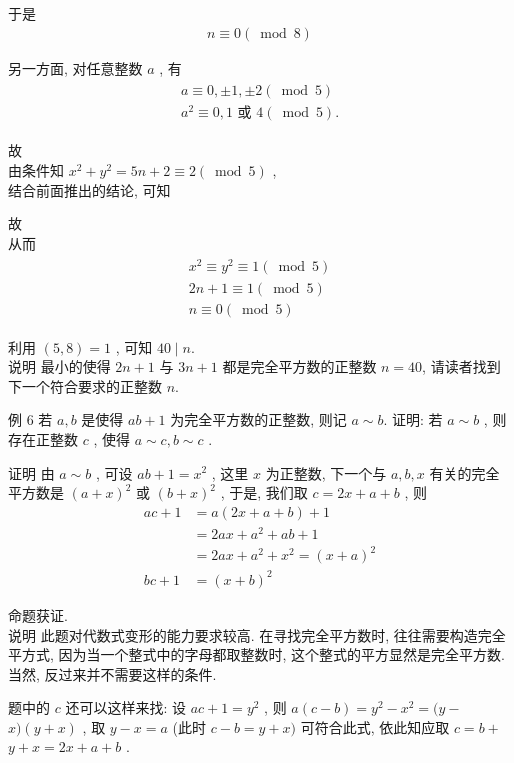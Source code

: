 于是
\begin{align*}
	n \equiv 0(\bmod 8)
\end{align*}

另一方面, 对任意整数 $a$ , 有
\begin{align*}
	\begin{gathered}
		a \equiv 0, \pm 1, \pm 2(\bmod 5) \\
		a^{2} \equiv 0,1 \text { 或 } 4(\bmod 5) .
	\end{gathered}
\end{align*}

故\\
由条件知 $x^{2}+y^{2}=5 n+2 \equiv 2(\bmod 5)$ , \\
结合前面推出的结论, 可知

故\\
从而
\begin{align*}
	\begin{gathered}
		x^{2} \equiv y^{2} \equiv 1(\bmod 5) \\
		2 n+1 \equiv 1(\bmod 5) \\
		n \equiv 0(\bmod 5)
	\end{gathered}
\end{align*}

利用 $(5,8)=1$ , 可知 $40 \mid n$.\\
说明 最小的使得 $2 n+1$ 与 $3 n+1$ 都是完全平方数的正整数 $n=40$, 请读者找到下一个符合要求的正整数 $n$.

例 6 若 $a ,  b$ 是使得 $a b+1$ 为完全平方数的正整数, 则记 $a \sim b$. 证明: 若 $a \sim b$ , 则存在正整数 $c$ , 使得 $a \sim c, b \sim c$ .

证明 由 $a \sim b$ , 可设 $a b+1=x^{2}$ , 这里 $x$ 为正整数, 下一个与 $a ,  b ,  x$ 有关的完全平方数是 $(a+x)^{2}$ 或 $(b+x)^{2}$ , 于是, 我们取 $c=2 x+a+b$ , 则\begin{align}
	a c+1 & =a(2 x+a+b)+1                \\
	      & =2 a x+a^{2}+a b+1           \\
	      & =2 a x+a^{2}+x^{2}=(x+a)^{2} \\
	b c+1 & =(x+b)^{2}
\end{align}

命题获证.\\
说明 此题对代数式变形的能力要求较高. 在寻找完全平方数时, 往往需要构造完全平方式, 因为当一个整式中的字母都取整数时, 这个整式的平方显然是完全平方数. 当然, 反过来并不需要这样的条件.

题中的 $c$ 还可以这样来找: 设 $a c+1=y^{2}$ , 则 $a(c-b)=y^{2}-x^{2}=(y-$ $x)(y+x)$ , 取 $y-x=a$ (此时 $c-b=y+x)$ 可符合此式, 依此知应取 $c=b+$ $y+x=2 x+a+b$ .

